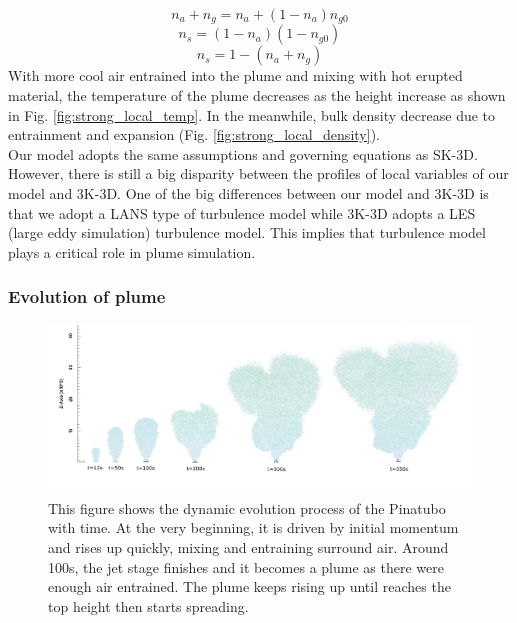\documentclass[journal abbreviation, manuscript]{copernicus}
\begin{document}
\begin{equation}
n_a + n_g = n_a + (1-n_a) n_{g0}
\label{eq:gas-frac-express}
\end{equation}
\begin{equation}
n_s = (1 - n_a) (1- n_{g0})
\label{eq:solid-frac-express1}
\end{equation}
\begin{equation}
n_s = 1 - (n_a + n_g)
\label{eq:solid-frac-express2}
\end{equation}
With more cool air entrained into the plume and mixing with hot erupted material, the temperature of the plume decreases as the height increase as shown in Fig. \ref{fig:strong_local_temp}. In the meanwhile, bulk density decrease due to entrainment and expansion (Fig. \ref{fig:strong_local_density}).\\
Our model adopts the same assumptions and governing equations as SK-3D. However, there is still a big disparity between the profiles of local variables of our model and 3K-3D. One of the big differences between our model and 3K-3D is that we adopt a LANS type of turbulence model while 3K-3D adopts a LES (large eddy simulation) turbulence model. This implies that turbulence model plays a critical role in plume simulation.
\subsubsection{Evolution of plume} 
\begin{figure}
\center
\includegraphics[width=15cm]{strong_elevation}
\caption{This figure shows the dynamic evolution process of the Pinatubo with time. At the very beginning, it is driven by initial momentum and rises up quickly, mixing and entraining surround air. Around 100s, the jet stage finishes and it becomes a plume as there were enough air entrained. The plume keeps rising up until reaches the top height then starts spreading.}
\label{fig:strong_evolution}
\end{figure}
\end{document}
